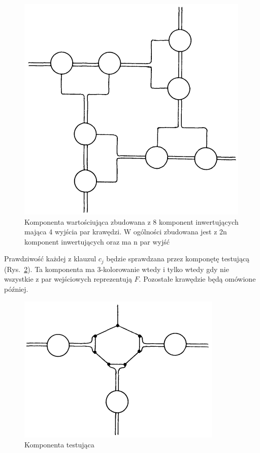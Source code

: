 \documentclass[12pt]{article}
\begin{document}
\begin{figure}[H]
    \centering
    \includegraphics[scale=1]{variable-setting_component.PNG}
    \caption{Komponenta wartościująca zbudowana z 8 komponent inwertujących mająca 4 wyjścia par krawędzi. W ogólności zbudowana jest z 2n komponent inwertujących oraz ma n par wyjść}
\label{fig:var-set_component}
\end{figure}

Prawdziwość każdej z klauzul $c_j$ będzie sprawdzana przez komponętę testującą (Rys.~\ref{fig:test_component}). Ta komponenta ma 3-kolorowanie wtedy i tylko wtedy gdy nie wszystkie z par wejściowych reprezentują $F$. Pozostałe krawędzie będą omówione później.

\begin{figure}[H]
    \centering
    \includegraphics[scale=1]{satisfaction-testing_component.PNG}
    \caption{Komponenta testująca}
\label{fig:test_component}
\end{figure}
\end{document}
